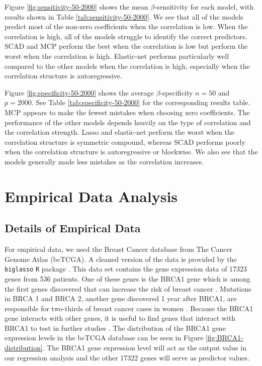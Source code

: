 \documentclass{article}
\begin{document}
Figure \ref{fig:sensitivity-50-2000} shows the mean $\beta$-sensitivity for each model, with results shown in Table \ref{tab:sensitivity-50-2000}. We see that all of the models predict most of the non-zero coefficients when the correlation is low. When the correlation is high, all of the models struggle to identify the correct predictors. SCAD and MCP perform the best when the correlation is low but perform the worst when the correlation is high. Elastic-net performs particularly well compared to the other models when the correlation is high, especially when the correlation structure is autoregressive.

Figure \ref{fig:specificity-50-2000} shows the average $\beta$-specificity $n = 50$ and $p = 2000$. See Table \ref{tab:specificity-50-2000} for the corresponding results table. MCP appears to make the fewest mistakes when choosing zero coefficients. The performance of the other models depends heavily on the type of correlation and the correlation strength. Lasso and elastic-net perform the worst when the correlation structure is symmetric compound, whereas SCAD performs poorly when the correlation structure is autoregressive or blockwise. We also see that the models generally made less mistakes as the correlation increases.

\section{Empirical Data Analysis}\label{sec:empirical}
\subsection{Details of Empirical Data}

For empirical data, we used the Breast Cancer database from The Cancer Genome Atlas (bcTCGA). A cleaned version of the data is provided by the \lstinline!biglasso! \lstinline!R! package \cite{zeng2017biglasso}. This data set contains the gene expression data of 17323 genes from 536 patients. One of these genes is the BRCA1 gene which is among the first genes discovered that can increase the risk of breast cancer \cite{kuchenbaecker2017risks, antoniou2003average}. Mutations in BRCA 1 and BRCA 2, another gene discovered 1 year after BRCA1, are responsible for two-thirds of breast cancer cases in women \cite{deng2000roles}. Because the BRCA1 gene interacts with other genes, it is useful to find genes that interact with BRCA1 to test in further studies \cite{deng2000roles}. The distribution of the BRCA1 gene expression levels in the bcTCGA database can be seen in Figure \ref{fig:BRCA1-distribution}. The BRCA1 gene expression level will act as the output value in our regression analysis and the other 17322 genes will serve as predictor values.
\end{document}
